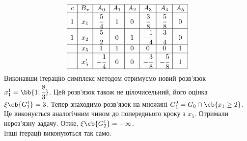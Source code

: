 \begin{exs}
\begin{equation}
\begin{array}{|c|c|c|c|c|c|c|c|}
		\hline
		c & B_x & A_0 & A_1 & A_2 & A_3 & A_4 & A_5\\
		\hline
		1 & x_1 & \cfrac54 & 1 & 0 & \cfrac38 & \cfrac58 & 0\\
		\hline
		1 & x_2 & \cfrac52 & 0 & 1 & -\cfrac14 & \cfrac34 & 0\\
		\hline
		  & x_5 & 1 & 1 & 0 & 0 & 0 & 1\\
		\hline
		  & x_5'& -\cfrac14& 0 & 0 & -\cfrac38 & -\cfrac58& 1\\
		\hline
	\end{array}
\end{equation}
Виконавши ітерацію симплекс методом отримуємо новий розв’язок $x_1^1 = \bb{1;\cfrac83}$. Цей розв’язок також не цілочисельний, його оцінка $\xi\cb{G_1^1} = 3$. Тепер знаходимо розв’язок на множині $G_1^2 = G_0 \cap \cb{x_1\geq 2}$. Це виконується аналогічним чином до попереднього кроку з $x_5$. Отримали нероз’язну задачу. Отже, $\xi\cb{G_2^1} = -\infty$.\\
Інші ітерації виконуються так само.
\end{exs}
